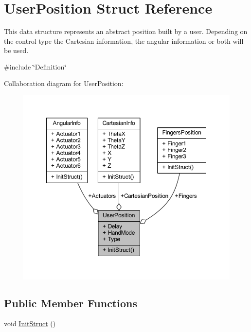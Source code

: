 \hypertarget{structUserPosition}{}\section{User\+Position Struct Reference}
\label{structUserPosition}


This data structure represents an abstract position built by a user. Depending on the control type the Cartesian information, the angular information or both will be used.  




{\ttfamily \#include \char`\"{}Definition\char`\"{}}



Collaboration diagram for User\+Position\+:
\nopagebreak
\begin{figure}[H]
\begin{center}
\leavevmode
\includegraphics[width=350pt]{d9/daa/structUserPosition__coll__graph}
\end{center}
\end{figure}
\subsection*{Public Member Functions}
\begin{DoxyCompactItemize}
\item 
void \hyperlink{structUserPosition_ad682f9be07fa2307028f86624ded2958}{Init\+Struct} ()
\end{DoxyCompactItemize}

